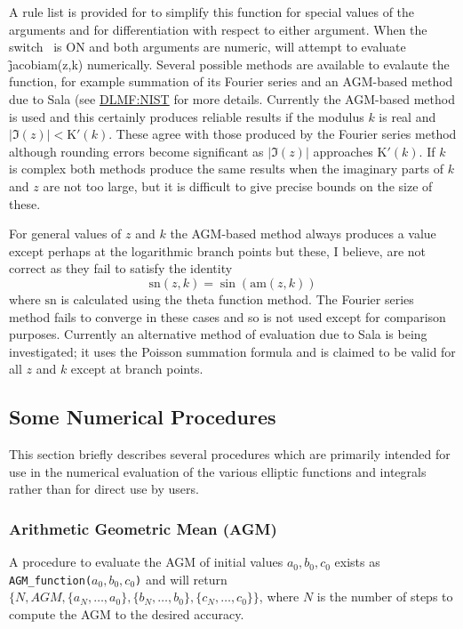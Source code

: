 A rule list is provided for to simplify this function for special values of the
arguments and for differentiation with respect to either argument.
When the switch \ is ON and both arguments
are numeric, \REDUCE will attempt to evaluate \f{jacobiam(z,k)} numerically.
Several possible methods are available to
evalaute the function, for example summation of its Fourier series and an
AGM-based method due to Sala (see \href{https://dlmf.nist.gov/22.20#vi}
{DLMF:NIST} for more details.
Currently the AGM-based method is used and this certainly produces reliable
results if the modulus $k$ is real and $|\Im(z)| < \mathrm{K}'(k)$. These
agree with those produced by the Fourier series method although rounding errors
become significant as $|\Im(z)|$ approaches $\mathrm{K}'(k)$.  If $k$ is complex
both methods produce the same results when the imaginary parts of $k$ and $z$
are not too large, but it is difficult to give precise bounds on the size of
these.

For general values of $z$ and $k$ the AGM-based method always produces a value
except perhaps at the logarithmic branch points but these, I believe, are
not correct as they fail to satisfy the identity
\[\mathrm{sn}(z,k) = \sin(\mathrm{am}(z,k)) \]
where $\mathrm{sn}$ is calculated using the theta function method. The Fourier
series method fails to converge in these cases and so is not used except for
comparison purposes.  Currently an alternative method of evaluation due to
Sala is being investigated; it uses the Poisson summation formula and is claimed
to be valid for all $z$ and $k$ except at branch points.

\subsection{Some Numerical Procedures}
This section briefly describes several procedures which are primarily
intended for use in the numerical evaluation of the various elliptic
functions and integrals rather than for direct use by users.

\subsubsection{Arithmetic Geometric Mean (AGM)}
\hypertarget{operator:AGM_FUNCTION}{}
A procedure to evaluate the AGM of initial values \(a_0,b_0,c_0\)
exists as \\
\texttt{AGM\_function(\(a_0,b_0,c_0\))} and will return \\
$\{ N, AGM, \{ a_N, \ldots ,a_0\}, \{ b_N, \ldots ,b_0\},
\{c_N, \ldots ,c_0\}\}$,
where $N$ is the number of steps to compute the AGM to the
desired accuracy.

